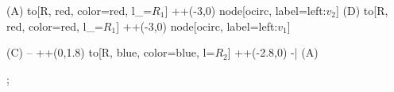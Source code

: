 \begin{CheatsheetEntryFrame}
{            %
            (A)
                to[R, red, color=red, l_=$R_1$] ++(-3,0)
                    node[ocirc, label=left:$v_2$]{}
            (D)
                to[R, red, color=red, l_=$R_1$] ++(-3,0)
                    node[ocirc, label=left:$v_1$]{}

            (C)
                -- ++(0,1.8)
                to[R, blue, color=blue, l=$R_2$] ++(-2.8,0)
                -| (A)

        ;
    }
    \TmpOpampSeparator

    

\end{CheatsheetEntryFrame}

